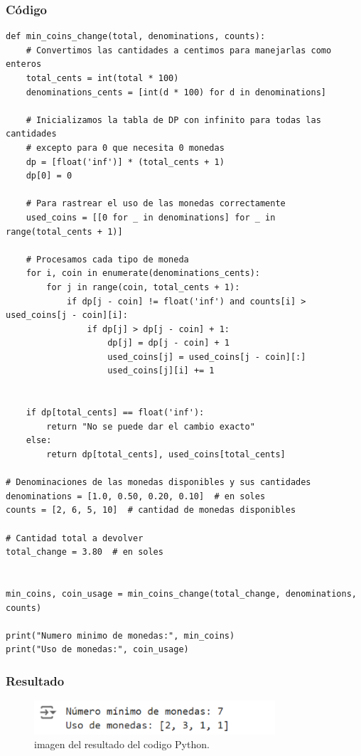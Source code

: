 \subsubsection{Código}
\begin{lstlisting}
def min_coins_change(total, denominations, counts):
    # Convertimos las cantidades a centimos para manejarlas como enteros
    total_cents = int(total * 100)
    denominations_cents = [int(d * 100) for d in denominations]

    # Inicializamos la tabla de DP con infinito para todas las cantidades
    # excepto para 0 que necesita 0 monedas
    dp = [float('inf')] * (total_cents + 1)
    dp[0] = 0

    # Para rastrear el uso de las monedas correctamente
    used_coins = [[0 for _ in denominations] for _ in range(total_cents + 1)]

    # Procesamos cada tipo de moneda
    for i, coin in enumerate(denominations_cents):
        for j in range(coin, total_cents + 1):
            if dp[j - coin] != float('inf') and counts[i] > used_coins[j - coin][i]:
                if dp[j] > dp[j - coin] + 1:
                    dp[j] = dp[j - coin] + 1
                    used_coins[j] = used_coins[j - coin][:]
                    used_coins[j][i] += 1


    if dp[total_cents] == float('inf'):
        return "No se puede dar el cambio exacto"
    else:
        return dp[total_cents], used_coins[total_cents]

# Denominaciones de las monedas disponibles y sus cantidades
denominations = [1.0, 0.50, 0.20, 0.10]  # en soles
counts = [2, 6, 5, 10]  # cantidad de monedas disponibles

# Cantidad total a devolver
total_change = 3.80  # en soles


min_coins, coin_usage = min_coins_change(total_change, denominations, counts)

print("Numero minimo de monedas:", min_coins)
print("Uso de monedas:", coin_usage)
\end{lstlisting}

\subsubsection{Resultado}
\begin{figure}[H]
    \centering
    \includegraphics[width=0.8\textwidth]{resultado_imagen.png}
    \caption{imagen del resultado del codigo Python.}
    \label{fig:resultado}
\end{figure}

